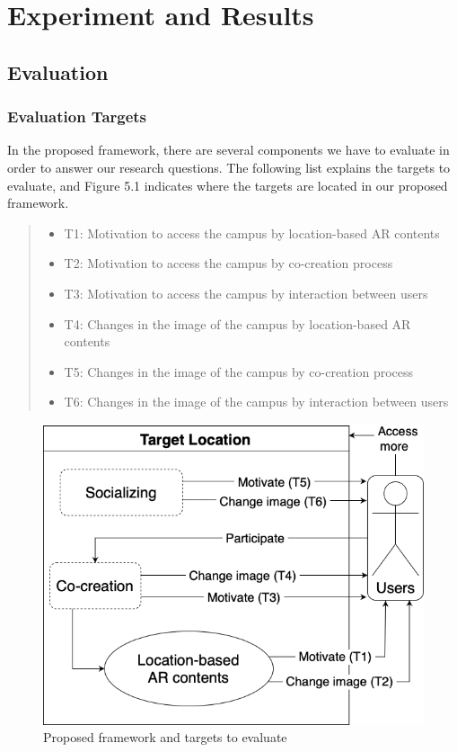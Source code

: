 \chapter{Experiment and Results}\label{ch:5}

\section{Evaluation}

\subsection{Evaluation Targets}

In the proposed framework, there are several components we have to evaluate in order to answer our research questions.
The following list explains the targets to evaluate, and Figure 5.1 indicates where the targets are located in our proposed framework.

\begin{quote}
  \begin{itemize}
    \item T1: Motivation to access the campus by location-based AR contents
    \item T2: Motivation to access the campus by co-creation process
    \item T3: Motivation to access the campus by interaction between users
    \item T4: Changes in the image of the campus by location-based AR contents
    \item T5: Changes in the image of the campus by co-creation process
    \item T6: Changes in the image of the campus by interaction between users
  \end{itemize}
\end{quote}

\begin{figure}[ht]
  \centering
  \includegraphics[width=0.8\columnwidth]{resources/5_experiment_and_results/proposed_framework_with_validate_targets.png}
    \caption{Proposed framework and targets to evaluate}
\end{figure}

